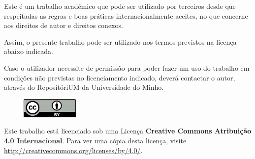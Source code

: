 Este é um trabalho académico que pode ser utilizado por terceiros desde que respeitadas as regras e boas práticas internacionalmente aceites, no que concerne aos direitos de autor e direitos conexos.

Assim, o presente trabalho pode ser utilizado nos termos previstos na licença abaixo indicada.

Caso o utilizador necessite de permissão para poder fazer um uso do trabalho em condições não previstas
no licenciamento indicado, deverá contactar o autor, através do RepositóriUM da Universidade do Minho.

\vspace{0.5cm}

\begin{figure}
    \vspace{-0.4cm}
    \includegraphics[width=0.25\textwidth]{img/licenca.png}
\end{figure}

Este trabalho está licenciado sob uma Licença \textbf{Creative Commons Atribuição 4.0 Internacional}. Para ver uma cópia desta licença, visite \url{http://creativecommons.org/licenses/by/4.0/}.
